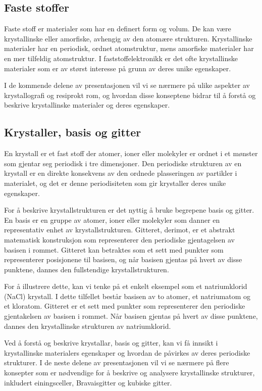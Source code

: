 \homeworkProblem[4] 

\subsection*{Faste stoffer}

Faste stoff er materialer som har en definert form og volum. De kan være krystallinske eller amorfiske, avhengig av den atomære strukturen. Krystallinske materialer har en periodisk, ordnet atomstruktur, mens amorfiske materialer har en mer tilfeldig atomstruktur. I faststoffelektronikk er det ofte krystallinske materialer som er av størst interesse på grunn av deres unike egenskaper.

I de kommende delene av presentasjonen vil vi se nærmere på ulike aspekter av krystallografi og resiprokt rom, og hvordan disse konseptene bidrar til å forstå og beskrive krystallinske materialer og deres egenskaper.

\subsection*{Krystaller, basis og gitter}

En krystall er et fast stoff der atomer, ioner eller molekyler er ordnet i et mønster som gjentar seg periodisk i tre dimensjoner. Den periodiske strukturen av en krystall er en direkte konsekvens av den ordnede plasseringen av partikler i materialet, og det er denne periodisiteten som gir krystaller deres unike egenskaper.

For å beskrive krystallstrukturen er det nyttig å bruke begrepene basis og gitter. En basis er en gruppe av atomer, ioner eller molekyler som danner en representativ enhet av krystallstrukturen. Gitteret, derimot, er et abstrakt matematisk konstruksjon som representerer den periodiske gjentagelsen av basisen i rommet. Gitteret kan betraktes som et sett med punkter som representerer posisjonene til basisen, og når basisen gjentas på hvert av disse punktene, dannes den fullstendige krystallstrukturen.

For å illustrere dette, kan vi tenke på et enkelt eksempel som et natriumklorid (NaCl) krystall. I dette tilfellet består basisen av to atomer, et natriumatom og et kloratom. Gitteret er et sett med punkter som representerer den periodiske gjentakelsen av basisen i rommet. Når basisen gjentas på hvert av disse punktene, dannes den krystallinske strukturen av natriumklorid.

Ved å forstå og beskrive krystallar, basis og gitter, kan vi få innsikt i krystallinske materialers egenskaper og hvordan de påvirkes av deres periodiske strukturer. I de neste delene av presentasjonen vil vi se nærmere på flere konsepter som er nødvendige for å beskrive og analysere krystallinske strukturer, inkludert einingsceller, Bravaisgitter og kubiske gitter.

